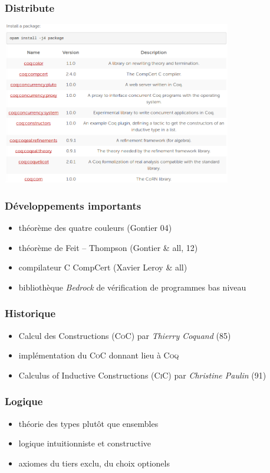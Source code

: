 \begin{frame}
  \frametitle{Distribute}
  \begin{center}
    \includegraphics[width=10cm]{images/opam}
  \end{center}
\end{frame}

\begin{frame}
  \frametitle{Développements importants}
  \begin{itemize}
    \item théorème des quatre couleurs (Gontier 04)
    \item théorème de Feit -- Thompson (Gontier \& all, 12)
    \item compilateur \textsc{C} CompCert (Xavier Leroy \& all)
    \item bibliothèque \emph{Bedrock} de vérification de programmes bas niveau
  \end{itemize}
\end{frame}

\begin{frame}
  \frametitle{Historique}
  \begin{itemize}
    \item Calcul des Constructions (\textsc{CoC}) par \emph{Thierry Coquand} (85)
    \item implémentation du \textsc{CoC} donnant lieu à \textsc{Coq}
    \item Calculus of Inductive Constructions (\textsc{CiC}) par \emph{Christine Paulin} (91)
  \end{itemize}
\end{frame}

\begin{frame}
  \frametitle{Logique}
  \begin{itemize}
    \item théorie des types plutôt que ensembles
    \item logique intuitionniste et constructive
    \item axiomes du tiers exclu, du choix optionels
  \end{itemize}
\end{frame}
